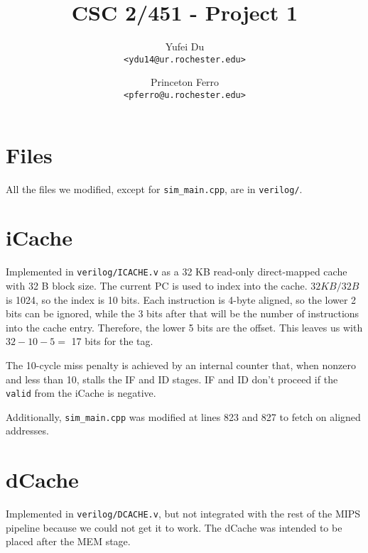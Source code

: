 \documentclass[a4paper,11pt]{article}
\title{CSC 2/451 - Project 1}
\author{
Yufei Du \\
\texttt{<ydu14@ur.rochester.edu>}
\and
Princeton Ferro \\
\texttt{<pferro@u.rochester.edu>}
}
\begin{document}
\maketitle

\section{Files}
All the files we modified, except for \texttt{sim\_main.cpp}, are in \texttt{verilog/}.

\section{iCache}
Implemented in \texttt{verilog/ICACHE.v} as a 32 KB read-only direct-mapped cache with 32 B block size. The current PC is used to index into the cache. $ 32KB / 32 B$ is 1024, so the index is 10 bits. Each instruction is 4-byte aligned, so the lower 2 bits can be ignored, while the 3 bits after that will be the number of instructions into the cache entry. Therefore, the lower 5 bits are the offset. This leaves us with $32-10-5 =$ 17 bits for the tag.

The 10-cycle miss penalty is achieved by an internal counter that, when nonzero and less than 10, stalls the IF and ID stages. IF and ID don't proceed if the \texttt{valid} from the iCache is negative.

Additionally, \texttt{sim\_main.cpp} was modified at lines 823 and 827 to fetch on aligned addresses.

\section{dCache}
Implemented in \texttt{verilog/DCACHE.v}, but not integrated with the rest of the MIPS pipeline because we could not get it to work. The dCache was intended to be placed after the MEM stage. 
\end{document}
